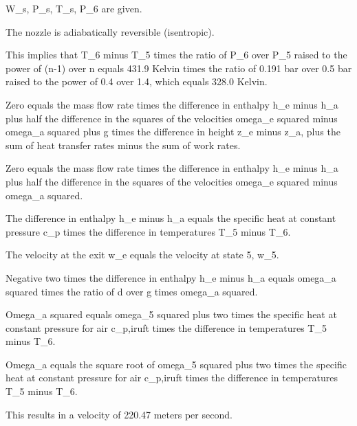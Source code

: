 W_s, P_s, T_s, P_6 are given.

The nozzle is adiabatically reversible (isentropic).

This implies that T_6 minus T_5 times the ratio of P_6 over P_5 raised to the power of (n-1) over n equals 431.9 Kelvin times the ratio of 0.191 bar over 0.5 bar raised to the power of 0.4 over 1.4, which equals 328.0 Kelvin.

Zero equals the mass flow rate times the difference in enthalpy h_e minus h_a plus half the difference in the squares of the velocities omega_e squared minus omega_a squared plus g times the difference in height z_e minus z_a, plus the sum of heat transfer rates minus the sum of work rates.

Zero equals the mass flow rate times the difference in enthalpy h_e minus h_a plus half the difference in the squares of the velocities omega_e squared minus omega_a squared.

The difference in enthalpy h_e minus h_a equals the specific heat at constant pressure c_p times the difference in temperatures T_5 minus T_6.

The velocity at the exit w_e equals the velocity at state 5, w_5.

Negative two times the difference in enthalpy h_e minus h_a equals omega_a squared times the ratio of d over g times omega_a squared.

Omega_a squared equals omega_5 squared plus two times the specific heat at constant pressure for air c_p,iruft times the difference in temperatures T_5 minus T_6.

Omega_a equals the square root of omega_5 squared plus two times the specific heat at constant pressure for air c_p,iruft times the difference in temperatures T_5 minus T_6.

This results in a velocity of 220.47 meters per second.